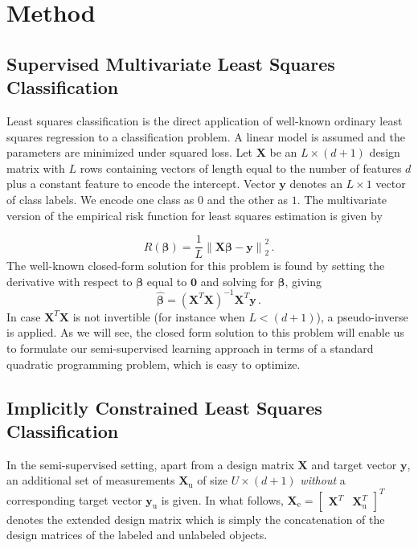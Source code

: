 \documentclass[twoside]{memoir}\usepackage[]{graphicx}\usepackage{xcolor}
\newcommand{\featdim}{d}
\newcommand{\Nunl}{U}
\newcommand{\Nlab}{L}
\begin{document}
\section{Method}
\label{section:method}

\subsection{Supervised Multivariate Least Squares Classification} \label{section:leastsquares}

Least squares classification \citep{Hastie2009,Rifkin2003} is the direct application of well-known ordinary least squares regression to a classification problem. A linear model is assumed and the parameters are minimized under squared loss. Let $\mathbf{X}$ be an $\Nlab \times (\featdim+1)$ design matrix with $\Nlab$ rows containing vectors of length equal to the number of features $\featdim$ plus a constant feature to encode the intercept. Vector $\mathbf{y}$ denotes an $\Nlab \times 1$ vector of  class labels. We encode one class as $0$ and the other as $1$.  The multivariate version of the empirical risk function for least squares estimation is given by

\begin{equation} \label{squaredloss}
\hat{R}(\boldsymbol{\beta}) = \frac{1}{\Nlab} \left\|  \mathbf{X} \boldsymbol{\beta}-\mathbf{y} \right\| _2^2 \, .
\end{equation}
The well-known closed-form solution for this problem is found by setting the derivative with respect to $\boldsymbol{\beta}$ equal to $\mathbf{0}$ and solving for $\boldsymbol{\beta}$, giving
\begin{equation} \label{olssolution}
\boldsymbol{\hat{\beta}}=\left(\mathbf{X}^T \mathbf{X}\right)^{-1} \mathbf{X}^T \mathbf{y} \, .
\end{equation}
In case $\mathbf{X}^T \mathbf{X}$ is not invertible (for instance when $L<(\featdim+1)$), a pseudo-inverse is applied. As we will see, the closed form solution to this problem will enable us to formulate our semi-supervised learning approach in terms of a standard quadratic programming problem, which is easy to optimize.

\subsection{Implicitly Constrained Least Squares Classification} \label{section:icls}

In the semi-supervised setting, apart from a design matrix $\mathbf{X}$ and target vector $\mathbf{y}$, an additional set of measurements $\mathbf{X}_\textrm{u}$ of size $\Nunl \times (\featdim+1)$ \emph{without} a corresponding target vector $\mathbf{y}_\textrm{u}$ is given. In what follows, $\mathbf{X}_\textrm{e}=\begin{bmatrix} \mathbf{X}^T  & \mathbf{X}_\textrm{u}^T \end{bmatrix}^T$ denotes the extended design matrix which is simply the concatenation of the design matrices of the labeled and unlabeled objects.
\end{document}
